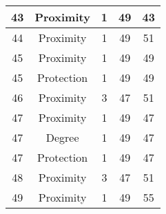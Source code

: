 \documentclass[results.tex]{subfiles}
\begin{document}
\begin{center}
\begin{tabular}{| c || c | c | c | c |}
            \hline
            43                      & Proximity                    & 1                      & 49                      & 43                   \\
            \hline
            44                      & Proximity                    & 1                      & 49                      & 51                   \\
            \hline
            45                      & Proximity                    & 1                      & 49                      & 49                   \\
            \hline
            45                      & Protection                   & 1                      & 49                      & 49                   \\
            \hline
            46                      & Proximity                    & 3                      & 47                      & 51                   \\
            \hline
            47                      & Proximity                    & 1                      & 49                      & 47                   \\
            \hline
            47                      & Degree                       & 1                      & 49                      & 47                   \\
            \hline
            47                      & Protection                   & 1                      & 49                      & 47                   \\
            \hline
            48                      & Proximity                    & 3                      & 47                      & 51                   \\
            \hline
            49                      & Proximity                    & 1                      & 49                      & 55                   \\
            \hline
        \end{tabular}
    \end{center}
\end{document}
